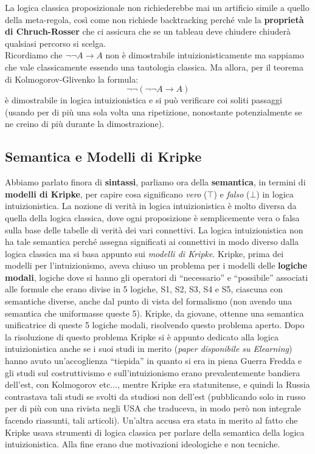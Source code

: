 \documentclass[a4paper,12pt, oneside]{book}
\begin{document}
La logica classica proposizionale non richiederebbe mai un artificio simile a
quello della meta-regola, così come non richiede backtracking perché vale la
\textbf{proprietà di Chruch-Rosser} che ci assicura che se un tableau deve
chiudere chiuderà qualsiasi percorso si scelga.\\
Ricordiamo che $\neg\neg A\to A$ non è dimostrabile intuizionisticamente ma
sappiamo che vale classicamente essendo una tautologia classica. Ma allora, per
il teorema di Kolmogorov-Glivenko la formula:
\[\neg\neg(\neg\neg A\to A)\]
è dimostrabile in logica intuizionistica e si può verificare coi soliti
passaggi (usando per di più una sola volta una ripetizione, nonostante
potenzialmente se ne creino di più durante la dimostrazione).
\subsection{Semantica e Modelli di Kripke}
Abbiamo parlato finora di \textbf{sintassi}, parliamo ora della
\textbf{semantica}, in termini di \textbf{modelli di Kripke}, per capire cosa
significano \textit{vero} ($\top$) e \textit{falso} ($\bot$) in logica
intuizionistica. La nozione di verità in logica intuizionistica è molto diversa
da quella della logica classica, dove ogni proposizione è semplicemente vera o
falsa sulla base delle tabelle di verità dei vari connettivi. La logica
intuizionistica non ha tale semantica perché assegna significati ai connettivi
in modo diverso dalla logica classica ma si basa appunto sui \textit{modelli di
  Kripke}. Kripke, prima dei modelli per l'intuizionismo, aveva chiuso un
problema per i modelli delle \textbf{logiche modali}, logiche dove si hanno gli
operatori di ``necessario'' e ``possibile'' associati alle formule che erano
divise in 5 logiche, S1, S2, S3, S4 e S5, ciascuna con semantiche diverse, anche
dal punto di vista del formalismo (non avendo una semantica che uniformasse
queste 5). Kripke, da giovane, ottenne una semantica unificatrice di queste 5
logiche modali, risolvendo questo problema aperto. Dopo la risoluzione di questo
problema Kripke si è appunto dedicato alla logica intuizionistica anche se i
suoi studi in merito (\textit{paper disponibile su Elearning}) hanno avuto
un'accoglienza ``tiepida'' in quanto si era in piena Guerra Fredda e gli studi
sul costruttivismo e sull'intuizionismo erano prevalentemente bandiera dell'est,
con Kolmogorov etc$\ldots$, mentre Kripke era statunitense, e quindi la Russia
contrastava tali studi se svolti da studiosi non dell'est (pubblicando solo in
russo per di più con una rivista negli USA che traduceva, in modo però non
integrale facendo riassunti, tali articoli). Un'altra accusa era
stata in merito al fatto che Kripke usava strumenti di logica classica per
parlare della semantica della logica intuizionistica. Alla fine erano due
motivazioni ideologiche e non tecniche.
\end{document}

